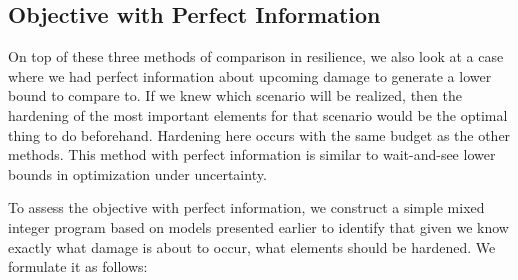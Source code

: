 \subsection{Objective with Perfect Information}

 On top of these three methods of comparison in resilience, we also look at a case where we had perfect information about upcoming damage to generate a lower bound to compare to. If we knew which scenario will be realized, then the hardening of the most important elements for that scenario would be the optimal thing to do beforehand. Hardening here occurs with the same budget as the other methods. This method with perfect information is similar to wait-and-see lower bounds in optimization under uncertainty.
 
To assess the objective with perfect information, we construct a simple mixed integer program based on models presented earlier to identify that given we know exactly what damage is about to occur, what elements should be hardened. We formulate it as follows:

